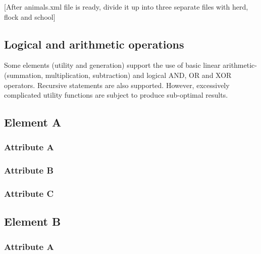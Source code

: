 \documentclass[]{article}
\begin{document}


[After animals.xml file is ready, divide it up into three separate files with herd, flock and school]

\subsection{Logical and arithmetic operations}

Some elements (utility and generation) support the use of basic linear arithmetic- (summation, multiplication, subtraction) and logical AND, OR and XOR operators. Recursive statements are also supported. However, excessively complicated utility functions are subject to produce sub-optimal results.

\subsection{Element A}

\subsubsection{Attribute A}

\subsubsection{Attribute B}

\subsubsection{Attribute C}

\subsection{Element B}

\subsubsection{Attribute A}
\end{document}
